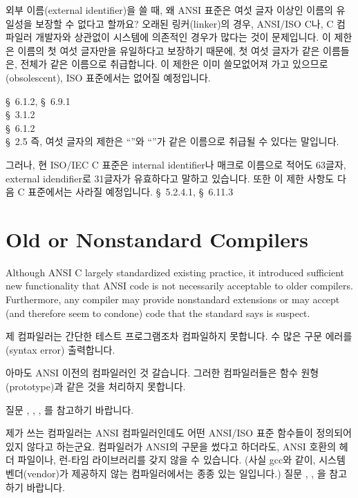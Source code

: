 \begin{faq}
	외부 이름(external identifier)을 쓸 때, 왜 ANSI 표준은
	여섯 글자 이상인 이름의 유일성을 보장할 수 없다고 할까요?
\A
	오래된 링커(linker)의 경우, ANSI/ISO C나, C 컴파일러
	개발자와 상관없이 시스템에 의존적인 경우가 많다는 것이 문제입니다.
	이 제한은 이름의 첫 여섯 글자만을 유일하다고 보장하기 때문에,
	첫 여섯 글자가 같은 이름들은, 전체가 같은 이름으로 취급합니다.
	이 제한은 이미 쓸모없어져 가고 있으므로 (obsolescent),
        ISO 표준에서는	없어질 예정입니다.

	
\R
	\cite{c89} \S\ 6.1.2, \S\ 6.9.1 \\
	\cite{rationale} \S\ 3.1.2 \\
	\cite{c9x} \S\ 6.1.2 \\
	\cite{hs} \S\ 2.5 
\T
	즉, 여섯 글자의 제한은 
        ``''와 ``''가 같은 이름으로
        취급될 수 있다는 말입니다.

        그러나, 현 ISO/IEC C 표준은 internal identifier나 매크로 이름으로
        적어도 63글자, external idendifier로 31글자가 유효하다고 말하고
        있습니다. 또한 이 제한 사항도 다음 C 표준에서는 사라질 예정입니다.
\R
	\cite{c99} \S\ 5.2.4.1, \S\ 6.11.3
\end{faq}

\section{Old or Nonstandard Compilers}
Although ANSI C largely standardized existing practice, it introduced sufficient
new functionality that ANSI code is not necessarily acceptable to older
compilers.  Furthermore, any compiler may provide nonstandard extensions or
may accept (and therefore seem to condone) code that the standard says is
suspect.

\begin{faq}
	제 컴파일러는 간단한 테스트 프로그램조차 컴파일하지
	못합니다.  수 많은 구문 에러를 (syntax error) 출력합니다.

\A
	아마도 ANSI 이전의 컴파일러인 것 갈습니다.  그러한 컴파일러들은
	함수 원형(prototype)과 같은 것을 처리하지 못합니다.

	질문 , , , 를 참고하기 바랍니다.
\end{faq}

\begin{faq}
	제가 쓰는 컴파일러는 ANSI 컴파일러인데도 어떤 ANSI/ISO 표준
	함수들이 정의되어 있지 않다고 하는군요.
\A
	컴파일러가 ANSI의 구문을 썼다고 하더라도, ANSI 호환의 헤더 파일이나,
	런-타임 라이브러리를 갖지 않을 수 있습니다.  (사실
	gcc와 같이, 시스템 벤더(vendor)가 제공하지 않는 컴파일러에서는
	종종 있는 일입니다.) 질문 , , 
        을 참고하기 바랍니다.
\end{faq}


